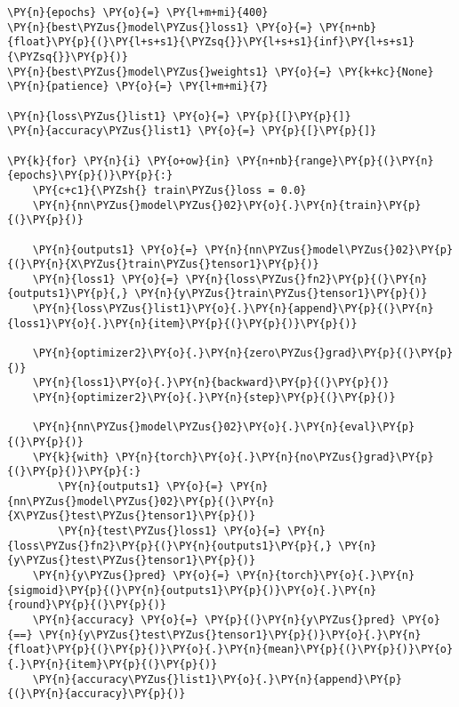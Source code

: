    \begin{tcolorbox}[breakable, size=fbox, boxrule=1pt, pad at break*=1mm,colback=cellbackground, colframe=cellborder]
\begin{Verbatim}[commandchars=\\\{\}]
\PY{n}{epochs} \PY{o}{=} \PY{l+m+mi}{400}
\PY{n}{best\PYZus{}model\PYZus{}loss1} \PY{o}{=} \PY{n+nb}{float}\PY{p}{(}\PY{l+s+s1}{\PYZsq{}}\PY{l+s+s1}{inf}\PY{l+s+s1}{\PYZsq{}}\PY{p}{)}
\PY{n}{best\PYZus{}model\PYZus{}weights1} \PY{o}{=} \PY{k+kc}{None}
\PY{n}{patience} \PY{o}{=} \PY{l+m+mi}{7}

\PY{n}{loss\PYZus{}list1} \PY{o}{=} \PY{p}{[}\PY{p}{]}
\PY{n}{accuracy\PYZus{}list1} \PY{o}{=} \PY{p}{[}\PY{p}{]}

\PY{k}{for} \PY{n}{i} \PY{o+ow}{in} \PY{n+nb}{range}\PY{p}{(}\PY{n}{epochs}\PY{p}{)}\PY{p}{:}
    \PY{c+c1}{\PYZsh{} train\PYZus{}loss = 0.0}
    \PY{n}{nn\PYZus{}model\PYZus{}02}\PY{o}{.}\PY{n}{train}\PY{p}{(}\PY{p}{)}

    \PY{n}{outputs1} \PY{o}{=} \PY{n}{nn\PYZus{}model\PYZus{}02}\PY{p}{(}\PY{n}{X\PYZus{}train\PYZus{}tensor1}\PY{p}{)}
    \PY{n}{loss1} \PY{o}{=} \PY{n}{loss\PYZus{}fn2}\PY{p}{(}\PY{n}{outputs1}\PY{p}{,} \PY{n}{y\PYZus{}train\PYZus{}tensor1}\PY{p}{)}
    \PY{n}{loss\PYZus{}list1}\PY{o}{.}\PY{n}{append}\PY{p}{(}\PY{n}{loss1}\PY{o}{.}\PY{n}{item}\PY{p}{(}\PY{p}{)}\PY{p}{)}

    \PY{n}{optimizer2}\PY{o}{.}\PY{n}{zero\PYZus{}grad}\PY{p}{(}\PY{p}{)}
    \PY{n}{loss1}\PY{o}{.}\PY{n}{backward}\PY{p}{(}\PY{p}{)}
    \PY{n}{optimizer2}\PY{o}{.}\PY{n}{step}\PY{p}{(}\PY{p}{)}

    \PY{n}{nn\PYZus{}model\PYZus{}02}\PY{o}{.}\PY{n}{eval}\PY{p}{(}\PY{p}{)}
    \PY{k}{with} \PY{n}{torch}\PY{o}{.}\PY{n}{no\PYZus{}grad}\PY{p}{(}\PY{p}{)}\PY{p}{:}
        \PY{n}{outputs1} \PY{o}{=} \PY{n}{nn\PYZus{}model\PYZus{}02}\PY{p}{(}\PY{n}{X\PYZus{}test\PYZus{}tensor1}\PY{p}{)}
        \PY{n}{test\PYZus{}loss1} \PY{o}{=} \PY{n}{loss\PYZus{}fn2}\PY{p}{(}\PY{n}{outputs1}\PY{p}{,} \PY{n}{y\PYZus{}test\PYZus{}tensor1}\PY{p}{)}
    \PY{n}{y\PYZus{}pred} \PY{o}{=} \PY{n}{torch}\PY{o}{.}\PY{n}{sigmoid}\PY{p}{(}\PY{n}{outputs1}\PY{p}{)}\PY{o}{.}\PY{n}{round}\PY{p}{(}\PY{p}{)}
    \PY{n}{accuracy} \PY{o}{=} \PY{p}{(}\PY{n}{y\PYZus{}pred} \PY{o}{==} \PY{n}{y\PYZus{}test\PYZus{}tensor1}\PY{p}{)}\PY{o}{.}\PY{n}{float}\PY{p}{(}\PY{p}{)}\PY{o}{.}\PY{n}{mean}\PY{p}{(}\PY{p}{)}\PY{o}{.}\PY{n}{item}\PY{p}{(}\PY{p}{)}
    \PY{n}{accuracy\PYZus{}list1}\PY{o}{.}\PY{n}{append}\PY{p}{(}\PY{n}{accuracy}\PY{p}{)}


\end{Verbatim}
\end{tcolorbox}
